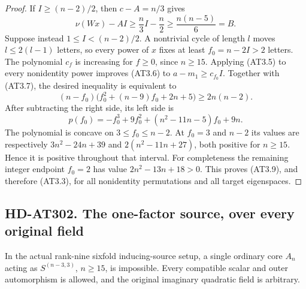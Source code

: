 \begin{proof}
If $I\ge(n-2)/2$, then $c-A=n/3$ gives
\[
 \nu(Wx)-AI\ge\frac n3 I-\frac n2
                 \ge\frac{n(n-5)}6=B.                    \tag{AT3.8}
\]
Suppose instead $1\le I<(n-2)/2$.  A nontrivial cycle of
length $l$ moves $l\le2(l-1)$ letters, so every power of $x$
fixes at least $f_0=n-2I>2$ letters.  The polynomial $c_f$
is increasing for $f\ge0$, since $n\ge15$.  Applying (AT3.5)
to every nonidentity power improves (AT3.6) to
$a-m_1\ge c_{f_0}I$.  Together with (AT3.7), the desired
inequality is equivalent to
\[
 (n-f_0)\bigl(f_0^2+(n-9)f_0+2n+5\bigr)
                               \ge2n(n-2).                \tag{AT3.9}
\]
After subtracting the right side, its left side is
\[
 p(f_0)=-f_0^3+9f_0^2+(n^2-11n-5)f_0+9n.                 \tag{AT3.10}
\]
The polynomial is concave on $3\le f_0\le n-2$.
At $f_0=3$ and $n-2$ its values are respectively
$3n^2-24n+39$ and $2(n^2-11n+27)$, both positive for
$n\ge15$.  Hence it is positive throughout that interval.
For completeness the remaining integer endpoint $f_0=2$
has value $2n^2-13n+18>0$.
This proves (AT3.9), and therefore (AT3.3), for all nonidentity
permutations and all target eigenspaces.
\end{proof}

\subsection*{HD-AT302. The one-factor source, over every original field}

\begin{theorem}[HD-AT302]
In the actual rank-nine sixfold inducing-source setup, a single
ordinary core $A_n$ acting as $S^{(n-3,3)}$, $n\ge15$, is
impossible.  Every compatible scalar and outer automorphism is
allowed, and the original imaginary quadratic field is arbitrary.
\end{theorem}

